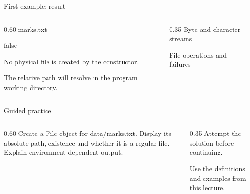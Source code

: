 \documentclass[10pt,aspectratio=169]{beamer}
\begin{document}
\begin{frame}[fragile,t]{First example: result}
\begin{columns}[T,onlytextwidth]\begin{column}{0.60\textwidth}
marks.txt\par false\par No physical file is created by the constructor.\par The relative path will resolve in the program working directory.
\end{column}\begin{column}{0.35\textwidth}\small
Byte and character streams

File operations and failures
\end{column}\end{columns}
\end{frame}

\begin{frame}[fragile,t]{Guided practice}
\begin{columns}[T,onlytextwidth]\begin{column}{0.60\textwidth}
Create a File object for data/marks.txt. Display its absolute path, existence and whether it is a regular file. Explain environment-dependent output.
\end{column}\begin{column}{0.35\textwidth}\small
Attempt the solution before continuing.

Use the definitions and examples from this lecture.
\end{column}\end{columns}
\end{frame}
\end{document}
